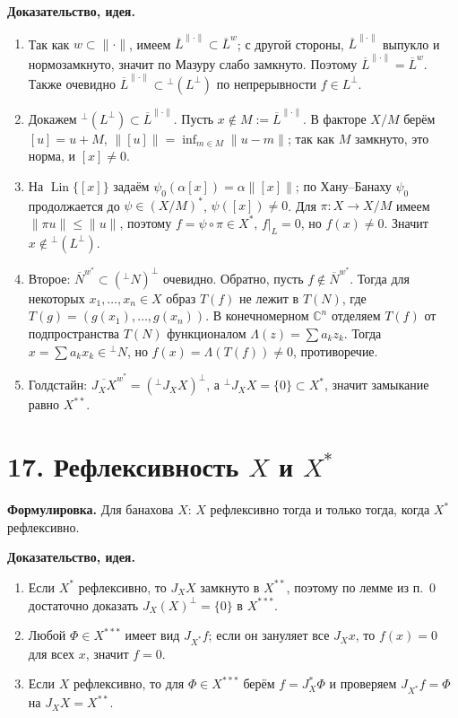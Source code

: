 \documentclass[10pt,a4paper]{article}
\newcommand{\X}{X}
\newcommand{\CC}{\mathbb C}
\newcommand{\Lin}{\operatorname{Lin}}
\begin{document}
	\textbf{Доказательство, идея.}
	\begin{enumerate}
		\item Так как $w\subset\|\cdot\|$, имеем $\overline L^{\|\cdot\|}\subset\overline L^w$; с другой стороны, $\overline L^{\|\cdot\|}$ выпукло и нормозамкнуто, значит по Мазуру слабо замкнуто. Поэтому $\overline L^{\|\cdot\|}=\overline L^w$. Также очевидно $\overline L^{\|\cdot\|}\subset{}^\perp(L^\perp)$ по непрерывности $f\in L^\perp$.
		\item Докажем ${}^\perp(L^\perp)\subset\overline L^{\|\cdot\|}$. Пусть $x\notin M:=\overline L^{\|\cdot\|}$. В факторе $\X/M$ берём $[u]=u+M$, $\|[u]\|=\inf_{m\in M}\|u-m\|$; так как $M$ замкнуто, это норма, и $[x]\ne0$.
		\item На $\Lin\{[x]\}$ задаём $\psi_0(\alpha[x])=\alpha\|[x]\|$; по Хану--Банаху $\psi_0$ продолжается до $\psi\in(\X/M)^\ast$, $\psi([x])\ne0$. Для $\pi:\X\to\X/M$ имеем $\|\pi u\|\le\|u\|$, поэтому $f=\psi\circ\pi\in\X^\ast$, $f|_L=0$, но $f(x)\ne0$. Значит $x\notin{}^\perp(L^\perp)$.
		\item Второе: $\overline N^{w^\ast}\subset({}^\perp N)^\perp$ очевидно. Обратно, пусть $f\notin\overline N^{w^\ast}$. Тогда для некоторых $x_1,\ldots,x_n\in\X$ образ $T(f)$ не лежит в $T(N)$, где $T(g)=(g(x_1),\ldots,g(x_n))$. В конечномерном $\CC^n$ отделяем $T(f)$ от подпространства $T(N)$ функционалом $\Lambda(z)=\sum a_kz_k$. Тогда $x=\sum a_kx_k\in{}^\perp N$, но $f(x)=\Lambda(T(f))\ne0$, противоречие.
		\item Голдстайн: $\overline{J_\X\X}^{w^\ast}=({}^\perp J_\X\X)^\perp$, а ${}^\perp J_\X\X=\{0\}\subset\X^\ast$, значит замыкание равно $\X^{\ast\ast}$.
	\end{enumerate}

	\section*{17. Рефлексивность $\X$ и $\X^\ast$}
	\textbf{Формулировка.} Для банахова $\X$: $\X$ рефлексивно тогда и только тогда, когда $\X^\ast$ рефлексивно.

	\textbf{Доказательство, идея.}
	\begin{enumerate}
		\item Если $\X^\ast$ рефлексивно, то $J_\X\X$ замкнуто в $\X^{\ast\ast}$, поэтому по лемме из п.~0 достаточно доказать $J_\X(\X)^\perp=\{0\}$ в $\X^{\ast\ast\ast}$.
		\item Любой $\Phi\in\X^{\ast\ast\ast}$ имеет вид $J_{\X^\ast}f$; если он зануляет все $J_\X x$, то $f(x)=0$ для всех $x$, значит $f=0$.
		\item Если $\X$ рефлексивно, то для $\Phi\in\X^{\ast\ast\ast}$ берём $f=J_\X^\ast\Phi$ и проверяем $J_{\X^\ast}f=\Phi$ на $J_\X\X=\X^{\ast\ast}$.
	\end{enumerate}
\end{document}
